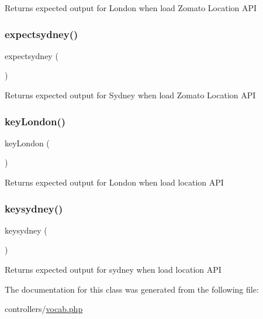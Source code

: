 \begin{DoxyReturn}{Returns}
expected output for London when load Zomato Location A\+PI 
\end{DoxyReturn}
\mbox{\label{classvocab_a4741a8bc50fd4f346d8671e4cfd99bf7}} 
\subsubsection{\texorpdfstring{expectsydney()}{expectsydney()}}
{\footnotesize\ttfamily expectsydney (\begin{DoxyParamCaption}{ }\end{DoxyParamCaption})}

\begin{DoxyReturn}{Returns}
expected output for Sydney when load Zomato Location A\+PI 
\end{DoxyReturn}
\mbox{\label{classvocab_a0ec3bfa6a46eb82117bc585e3f4ae367}} 
\subsubsection{\texorpdfstring{key\+London()}{keyLondon()}}
{\footnotesize\ttfamily key\+London (\begin{DoxyParamCaption}{ }\end{DoxyParamCaption})}

\begin{DoxyReturn}{Returns}
expected output for London when load location A\+PI 
\end{DoxyReturn}
\mbox{\label{classvocab_a154d9bd15e3326b9d91eaec11e4f4962}} 
\subsubsection{\texorpdfstring{keysydney()}{keysydney()}}
{\footnotesize\ttfamily keysydney (\begin{DoxyParamCaption}{ }\end{DoxyParamCaption})}

\begin{DoxyReturn}{Returns}
expected output for sydney when load location A\+PI 
\end{DoxyReturn}


The documentation for this class was generated from the following file\+:\begin{DoxyCompactItemize}
\item 
controllers/\mbox{\hyperlink{vocab_8php}{vocab.\+php}}\end{DoxyCompactItemize}

